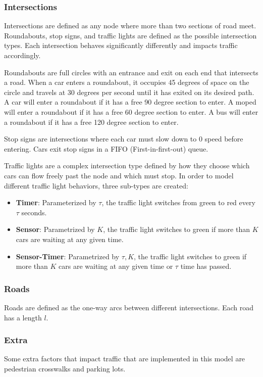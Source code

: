 \documentclass[conference]{IEEEtran}
\begin{document}
\subsubsection{Intersections}
Intersections are defined as any node where more than two sections of road meet.
Roundabouts, stop signs, and traffic lights are defined as the possible intersection types. 
Each intersection behaves significantly differently and impacts traffic accordingly.

Roundabouts are full circles with an entrance and exit on each end that intersects a road. 
When a car enters a roundabout, it occupies 45 degrees of space on the circle and travels at 30 degrees per second until it has exited on its desired path.
A car will enter a roundabout if it has a free 90 degree section to enter.
A moped will enter a roundabout if it has a free 60 degree section to enter.
A bus will enter a roundabout if it has a free 120 degree section to enter.

Stop signs are intersections where each car must slow down to 0 speed before entering. 
Cars exit stop signs in a FIFO (First-in-first-out) queue.

Traffic lights are a complex intersection type defined by how they choose which cars can flow freely past the node and which must stop.
In order to model different traffic light behaviors, three sub-types are created:
\begin{itemize}
    \item \textbf{Timer}: Parameterized by $\tau$, the traffic light switches from green to red every $\tau$ seconds.
    \item \textbf{Sensor}: Parametrized by $K$, the traffic light switches to green if more than $K$ cars are waiting at any given time.
    \item \textbf{Sensor-Timer}: Parametrized by $\tau, K$, the traffic light switches to green if more than $K$ cars are waiting at any given time or $\tau$ time has passed.   
\end{itemize}
\subsubsection{Roads}
Roads are defined as the one-way arcs between different intersections.
Each road has a length $l$.
\subsubsection{Extra}
Some extra factors that impact traffic that are implemented in this model are pedestrian crosswalks and parking lots.
\end{document}
